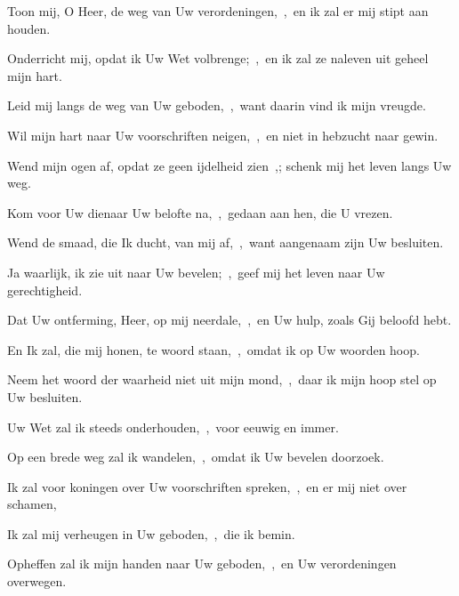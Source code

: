 \documentclass[12pt,twoside,a5paper]{article}
\begin{document}
\begin{halfparskip}
   Toon mij, O Heer, de weg van Uw verordeningen,~\sep\ en ik zal er mij stipt aan houden.


  Onderricht mij, opdat ik Uw Wet volbrenge;~\sep\ en ik zal ze naleven uit geheel mijn hart.

  Leid mij langs de weg van Uw geboden,~\sep\ want daarin vind ik mijn vreugde.

  Wil mijn hart naar Uw voorschriften neigen,~\sep\ en niet in hebzucht naar gewin.

  Wend mijn ogen af, opdat ze geen ijdelheid zien~\sep ; schenk mij het leven langs Uw weg.

  Kom voor Uw dienaar Uw belofte na,~\sep\ gedaan aan hen, die U vrezen.

  Wend de smaad, die Ik ducht, van mij af,~\sep\ want aangenaam zijn Uw besluiten.

  Ja waarlijk, ik zie uit naar Uw bevelen;~\sep\ geef mij het leven naar Uw gerechtigheid.
\end{halfparskip}

\begin{halfparskip}
   Dat Uw ontferming, Heer, op mij neerdale,~\sep\ en Uw hulp, zoals Gij beloofd hebt.


  En Ik zal, die mij honen, te woord staan,~\sep\ omdat ik op Uw woorden hoop.

  Neem het woord der waarheid niet uit mijn mond,~\sep\ daar ik mijn hoop stel op Uw besluiten.

  Uw Wet zal ik steeds onderhouden,~\sep\ voor eeuwig en immer.

  Op een brede weg zal ik wandelen,~\sep\ omdat ik Uw bevelen doorzoek.

  Ik zal voor koningen over Uw voorschriften spreken,~\sep\ en er mij niet over schamen,

  Ik zal mij verheugen in Uw geboden,~\sep\ die ik bemin.

  Opheffen zal ik mijn handen naar Uw geboden,~\sep\ en Uw verordeningen overwegen.
\end{halfparskip}
\end{document}
